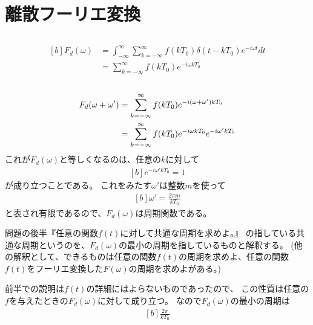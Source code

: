\documentclass[../ap_2013.tex]{subfiles}
\begin{document}
\setcounter{chapter}{4}
\chapter{離散フーリエ変換}
\section{}
\begin{equation}\begin{aligned}[b]
    F_d(\omega)
    &= \int_{-\infty}^{\infty}\sum_{k=-\infty}^{\infty}f(kT_0)\delta(t-kT_0)e^{-i\omega t}dt\\
    &= \sum_{k=-\infty}^{\infty}f(kT_0)e^{-i\omega kT_0}
\end{aligned}\end{equation}

\section{}
\begin{equation}\begin{aligned}[b]
    F_d\qty(\omega+\omega')
    &= \sum_{k=-\infty}^{\infty}f(kT_0)e^{-i(\omega+\omega')kT_0}\\
    &= \sum_{k=-\infty}^{\infty}f(kT_0)e^{-i\omega kT_0}e^{-i\omega' kT_0}
\end{aligned}\end{equation}
これが\(F_d(\omega)\)と等しくなるのは、任意の\(k\)に対して
\begin{equation}\begin{aligned}[b]
    e^{-i\omega' kT_0} = 1
\end{aligned}\end{equation}
が成り立つことである。
これをみたす\(\omega'\)は整数\(m\)を使って
\begin{equation}\begin{aligned}[b]
    \omega' = \frac{2\pi m}{kT_0}
\end{aligned}\end{equation}
と表され有限であるので、\(F_d(\omega)\)は周期関数である。

問題の後半『任意の関数\(f(t)\)に対して共通な周期を求めよ。』
の指している共通な周期というのを、\(F_d(\omega)\)の最小の周期を指しているものと解釈する。
(他の解釈として、できるものは任意の関数\(f(t)\)の周期を求めよ、任意の関数\(f(t)\)をフーリエ変換した\(F(\omega)\)の周期を求めよがある。)

前半での説明は\(f(t)\)の詳細にはよらないものであったので、
この性質は任意の\(f\)を与えたときの\(F_d(\omega)\)に対して成り立つ。
なので\(F_d(\omega)\)の最小の周期は
\begin{equation}\begin{aligned}[b]
    \frac{2\pi}{kT_0}
\end{aligned}\end{equation}
\end{document}
